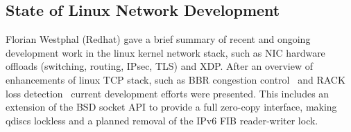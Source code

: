 \subsection{State of Linux Network Development} \label{fwestphal}

Florian Westphal (Redhat) gave a brief summary of recent and ongoing
development work in the linux kernel network stack, such as NIC hardware
offloads (switching, routing, IPsec, TLS) and \ac{XDP}.  After an overview of
enhancements of linux TCP stack, such as BBR congestion
control~\cite{ncardwell:cacm:2017} and RACK loss
detection~\cite{draft-ietf-tcpm-rack} current development efforts were
presented.  This includes an extension of the BSD socket API to provide a full
zero-copy interface, making qdiscs lockless and a planned removal of the IPv6
\ac{FIB} reader-writer lock.
